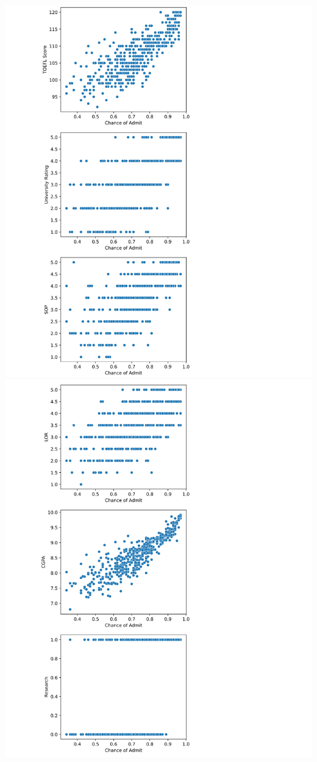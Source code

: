 \documentclass[a4paper]{article}
\begin{document}
  \includegraphics[scale=0.4]{33}
  \includegraphics[scale=0.4]{44}
\end{document}

